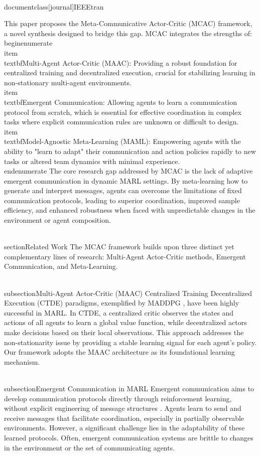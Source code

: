 \\documentclass[journal]{IEEEtran}
\begin{document}
This paper proposes the Meta-Communicative Actor-Critic (MCAC) framework, a novel synthesis designed to bridge this gap. MCAC integrates the strengths of:
\\begin{enumerate}
    \\item \\textbf{Multi-Agent Actor-Critic (MAAC)}: Providing a robust foundation for centralized training and decentralized execution, crucial for stabilizing learning in non-stationary multi-agent environments.
    \\item \\textbf{Emergent Communication}: Allowing agents to learn a communication protocol from scratch, which is essential for effective coordination in complex tasks where explicit communication rules are unknown or difficult to design.
    \\item \\textbf{Model-Agnostic Meta-Learning (MAML)}: Empowering agents with the ability to "learn to adapt" their communication and action policies rapidly to new tasks or altered team dynamics with minimal experience.
\\end{enumerate}
The core research gap addressed by MCAC is the lack of adaptive emergent communication in dynamic MARL settings. By meta-learning how to generate and interpret messages, agents can overcome the limitations of fixed communication protocols, leading to superior coordination, improved sample efficiency, and enhanced robustness when faced with unpredictable changes in the environment or agent composition.

\\section{Related Work}
The MCAC framework builds upon three distinct yet complementary lines of research: Multi-Agent Actor-Critic methods, Emergent Communication, and Meta-Learning.

\\subsection{Multi-Agent Actor-Critic (MAAC)}
Centralized Training Decentralized Execution (CTDE) paradigms, exemplified by MADDPG \cite{Lowe2017}, have been highly successful in MARL. In CTDE, a centralized critic observes the states and actions of all agents to learn a global value function, while decentralized actors make decisions based on their local observations. This approach addresses the non-stationarity issue by providing a stable learning signal for each agent's policy. Our framework adopts the MAAC architecture as its foundational learning mechanism.

\\subsection{Emergent Communication in MARL}
Emergent communication aims to develop communication protocols directly through reinforcement learning, without explicit engineering of message structures \cite{Sukhbaatar2016}. Agents learn to send and receive messages that facilitate coordination, especially in partially observable environments. However, a significant challenge lies in the adaptability of these learned protocols. Often, emergent communication systems are brittle to changes in the environment or the set of communicating agents.
\end{document}
